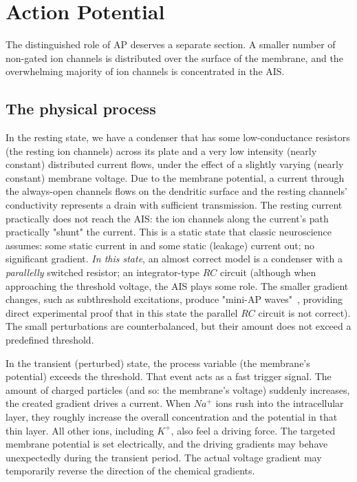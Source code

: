 
\section[Action Potential]{Action Potential\label{sec:Physics-ActionPotential}}



The distinguished role of \gls{AP} deserves a separate section.
A smaller number of non-gated ion channels is distributed over the surface of the membrane, and the overwhelming majority of ion channels is concentrated in the \gls{AIS}.


\subsection{The physical process\label{sec:AP-PhysicalProcess}}

In the resting state, we have a condenser that has some low-conductance resistors (the resting ion channels) across its plate and a very low intensity (nearly constant) distributed current flows, under the effect of a slightly varying (nearly constant) membrane voltage. Due to the membrane potential, a current through the always-open channels flows on the dendritic surface
and the resting channels' conductivity represents a drain with 
sufficient transmission. The resting current practically does not 
reach the \gls{AIS}: the ion channels along the current's path
practically "shunt" the current.
This is a static state that classic neuroscience assumes: some static current in and some static (leakage) current out; no significant gradient.
\textit{In this state}, an almost correct model is a condenser with a
\textit{parallelly} switched resistor; an integrator-type  $RC$ circuit
(although when approaching the threshold voltage, the \gls{AIS} plays some role. The smaller gradient changes, such as subthreshold excitations, produce "mini-\gls{AP} waves"~\cite{NeuralEnergyConsumption:2017}, providing direct experimental proof that in this state the parallel $RC$ circuit is not correct).
The small perturbations are counterbalanced, but their
amount does not exceed a predefined threshold.

In the transient (perturbed) state, the process variable
(the membrane's potential) exceeds the threshold. That event acts
as a fast trigger signal. The amount of charged particles (and so:
the membrane's voltage) suddenly increases, the created gradient
drives a current.
When $Na^+$ ions rush into the intracellular layer, they roughly increase the overall concentration and the potential in that thin layer.
All other ions, including $K^+$, also feel a driving force. The targeted membrane potential is set electrically,
and the driving gradients may behave unexpectedly during the transient period.
The actual voltage gradient may temporarily reverse the direction of the chemical gradients.

